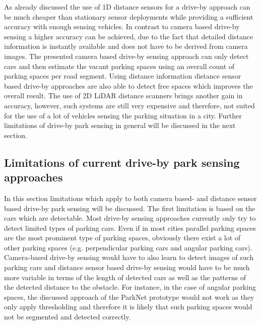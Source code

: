 As already discussed the use of 1D distance sensors for a drive-by approach can be much cheaper than stationary sensor deployments while providing a sufficient accuracy with enough sensing vehicles. In contrast to camera based drive-by sensing a higher accuracy can be achieved, due to the fact that detailed distance information is  instantly available and does not have to be derived from camera images. The presented camera based drive-by sensing approach can only detect cars and then estimate the vacant parking spaces using an overall count of parking spaces per road segment. Using distance information distance sensor based drive-by approaches are also able to detect free spaces which improves the overall result. The use of 2D LiDAR distance scanners brings another gain in accuracy, however, such systems are still very expensive and therefore, not suited for the use of a lot of vehicles sensing the parking situation in a city. Further limitations of drive-by park sensing in general will be discussed in the next section.


\subsection{Limitations of current drive-by park sensing approaches}
\label{sec:limitations_driveby_sensing}

In this section limitations which apply to both camera based- and distance sensor based drive-by park sensing will be discussed. The first limitation is based on the cars which are detectable. Most drive-by sensing approaches currently only try to detect limited types of parking cars. Even if in most cities parallel parking spaces are the most prominent type of parking spaces, obviously there exist a lot of other parking spaces (e.g. perpendicular parking cars and angular parking cars). Camera-based drive-by sensing would have to also learn to detect images of such parking cars and distance sensor based drive-by sensing would have to be much more variable in terms of the length of detected cars as well as the patterns of the detected distance to the obstacle. For instance, in the case of angular parking spaces, the discussed approach of the ParkNet prototype would not work as they only apply thresholding and therefore it is likely that such parking spaces would not be segmented and detected correctly.



